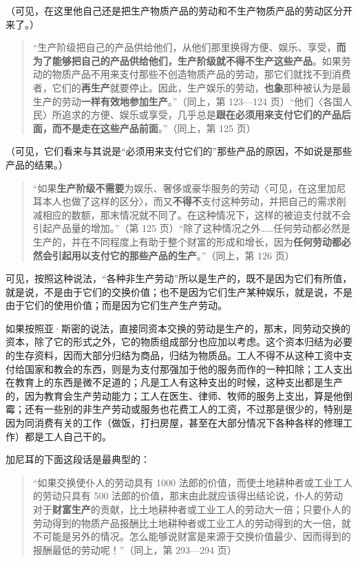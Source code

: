 （可见，在这里他自己还是把生产物质产品的劳动和不生产物质产品的劳动区分开来了。）

\begin{quote}“生产阶级把自己的产品供给他们，从他们那里换得方便、娱乐、享受，\textbf{而为了能够把自己的产品供给他们，生产阶级就不得不生产这些产品}。如果劳动的物质产品不用来支付那些不创造物质产品的劳动，那它们就找不到消费者，它们的\textbf{再生产}就要停止。因此，生产娱乐的劳动，\textbf{也象}那种被认为是最生产的劳动\textbf{一样有效地参加生产}。”（同上，第 123—124 页）“他们〈各国人民〉所追求的方便、娱乐或享受，几乎总是\textbf{跟在必须用来支付它们的产品后面，而不是走在这些产品前面}。”（同上，第 125 页）\end{quote}

（可见，它们看来与其说是“必须用来支付它们的”那些产品的原因，不如说是那些产品的结果。）

\begin{quote}“如果\textbf{生产阶级不需要}为娱乐、奢侈或豪华服务的劳动〈可见，在这里加尼耳本人也做了这样的区分〉，而又\textbf{不得不}支付这种劳动，并把自己的需求削减相应的数额，那末情况就不同了。在这种情况下，这样的被迫支付就不会引起产品量的增加。”（第 125 页）“除了这种情况之外……任何劳动都必然是生产的，并在不同程度上有助于整个财富的形成和增长，因为\textbf{任何劳动都必然会引起用以支付它的那些产品的生产}。”（同上，第 126 页）\end{quote}

\fontbox{~\{}可见，按照这种说法，“各种非生产劳动”所以是生产的，既不是因为它们有所值，就是说，不是由于它们的交换价值；也不是因为它们生产某种娱乐，就是说，不是由于它们的使用价值；而是因为它们生产生产劳动。\fontbox{\}~}

\fontbox{~\{}如果按照亚·斯密的说法，直接同资本交换的劳动是生产的，那末，同劳动交换的资本，除了它的形式之外，它的物质组成部分也应加以考虑。这个资本归结为必要的生存资料，因而大部分归结为商品，归结为物质品。工人不得不从这种工资中支付给国家和教会的东西，则是为支付那强加于他的服务而作的一种扣除；工人支出在教育上的东西是微不足道的；凡是工人有这种支出的时候，这种支出都是生产的，因为教育会生产劳动能力；工人在医生、律师、牧师的服务上支出，算是他倒霉；还有一些别的非生产劳动或服务也花费工人的工资，不过那是很少的，特别是因为同消费有关的工作（做饭，打扫房屋，甚至在大部分情况下各种各样的修理工作）都是工人自己干的。\fontbox{\}~}

加尼耳的下面这段话是最典型的：

\begin{quote}“如果交换使仆人的劳动具有 1000 法郎的价值，而使土地耕种者或工业工人的劳动只具有 500 法郎的价值，那末由此就应该得出结论说，仆人的劳动对于\textbf{财富生产}的贡献，比土地耕种者或工业工人的劳动大一倍；只要仆人的劳动得到的物质产品报酬比土地耕种者或工业工人的劳动得到的大一倍，就不可能是另外的情况。怎么能够说财富是来源于交换价值最少、因而得到的报酬最低的劳动呢！”（同上，第 293—294 页）\end{quote}

